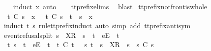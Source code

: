 \begin{isabellebody}
%
\isadelimproof
\ \ %
\endisadelimproof
%
\isatagproof
{}\isamarkupfalse%
\ {\isacharparenleft}induct\ x{\isacharcomma}\ auto{\isacharparenright}\isanewline
\ \ \isamarkupfalse%
\ tt{\isacharunderscore}prefix{\isachardot}elims{\isacharparenleft}{}{\isacharparenright}\ \isamarkupfalse%
\ blast%
\endisatagproof
{\isafoldproof}%
%
\isadelimproof
\isanewline
%
\endisadelimproof
\isanewline
{}\isamarkupfalse%
\ tt{\isacharunderscore}prefix{\isacharunderscore}notfront{\isacharunderscore}is{\isacharunderscore}whole{\isacharcolon}\isanewline
\ \ {\isachardoublequoteopen}t\ {\isasymle}\isactrlsub C\ s\ {\isacharat}\ {\isacharbrackleft}x{\isacharbrackright}\ {\isasymLongrightarrow}\ {\isasymnot}\ t\ {\isasymle}\isactrlsub C\ s\ {\isasymLongrightarrow}\ t\ {\isacharequal}\ s\ {\isacharat}\ {\isacharbrackleft}x{\isacharbrackright}{\isachardoublequoteclose}\isanewline
%
\isadelimproof
\ \ %
\endisadelimproof
%
\isatagproof
{}\isamarkupfalse%
\ {\isacharparenleft}induct\ t\ s\ rule{\isacharcolon}tt{\isacharunderscore}prefix{\isachardot}induct{\isacharcomma}\ auto\ simp\ add{\isacharcolon}\ tt{\isacharunderscore}prefix{\isacharunderscore}antisym{\isacharparenright}%
\endisatagproof
{\isafoldproof}%
%
\isadelimproof
\isanewline
%
\endisadelimproof
\isanewline
{}\isamarkupfalse%
\ event{\isacharunderscore}refusal{\isacharunderscore}split{\isacharcolon}\ {\isachardoublequoteopen}s{}\ {\isacharat}\ {\isacharbrackleft}X{\isacharbrackright}\isactrlsub R\ {\isacharhash}\ s{}\ {\isacharequal}\ t{}\ {\isacharat}\ {\isacharbrackleft}e{\isacharbrackright}\isactrlsub E\ {\isacharhash}\ t{}\ {\isasymLongrightarrow}\isanewline
\ \ {\isacharparenleft}{\isasymexists}t{}{\isacharprime}{\isachardot}\ s{}\ {\isacharequal}\ t{}\ {\isacharat}\ {\isacharbrackleft}e{\isacharbrackright}\isactrlsub E\ {\isacharhash}\ t{}{\isacharprime}\ {\isasymand}\ t{}{\isacharprime}\ {\isasymle}\isactrlsub C\ t{}{\isacharparenright}\ {\isasymor}\ {\isacharparenleft}{\isasymexists}\ s{}{\isacharprime}{\isachardot}\ t{}\ {\isacharequal}\ s{}\ {\isacharat}\ {\isacharbrackleft}X{\isacharbrackright}\isactrlsub R\ {\isacharhash}\ s{}{\isacharprime}\ {\isasymand}\ s{}{\isacharprime}\ {\isasymle}\isactrlsub C\ s{}{\isacharparenright}{\isachardoublequoteclose}\isanewline
%
\isadelimproof
\ \ %
\endisadelimproof
%
\isatagproof

\end{isabellebody}
